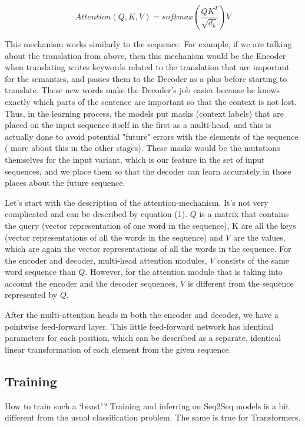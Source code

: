 \documentclass[conference,compsoc]{IEEEtran}
\begin{document}
\begin{equation}
Attention(Q, K, V) = softmax(\frac{QK^{T}}{\sqrt{d_k}}) V
\end{equation}

This mechanism works similarly to the sequence. For example, if we are talking about the translation from above, then this mechanism would be the Encoder when translating writes keywords related to the translation that are important for the semantics, and passes them to the Decoder as a plus before starting to translate. These new words make the Decoder's job easier because he knows exactly which parts of the sentence are important so that the context is not lost.
Thus, in the learning process, the models put masks (context labels) that are placed on the input sequence itself in the first as a multi-head, and this is actually done to avoid potential "future" errors with the elements of the sequence ( more about this in the other stages).
These masks would be the mutations themselves for the input variant, which is our feature in the set of input sequences, and we place them so that the decoder can learn accurately in those places about the future sequence.

\hspace{0pt}

Let’s start with the description of the attention-mechanism. It’s not very complicated and can be described by equation (1). $Q$ is a matrix that contains the query (vector representation of one word in the sequence), K are all the keys (vector representations of all the words in the sequence) and $V$ are the values, which are again the vector representations of all the words in the sequence. For the encoder and decoder, multi-head attention modules, $V$ consists of the same word sequence than $Q$. However, for the attention module that is taking into account the encoder and the decoder sequences, $V$ is different from the sequence represented by $Q$.

After the multi-attention heads in both the encoder and decoder, we have a pointwise feed-forward layer. This little feed-forward network has identical parameters for each position, which can be described as a separate, identical linear transformation of each element from the given sequence.

\subsection{Training}
How to train such a ‘beast’? Training and inferring on Seq2Seq models is a bit different from the usual classification problem. The same is true for Transformers.
\end{document}
